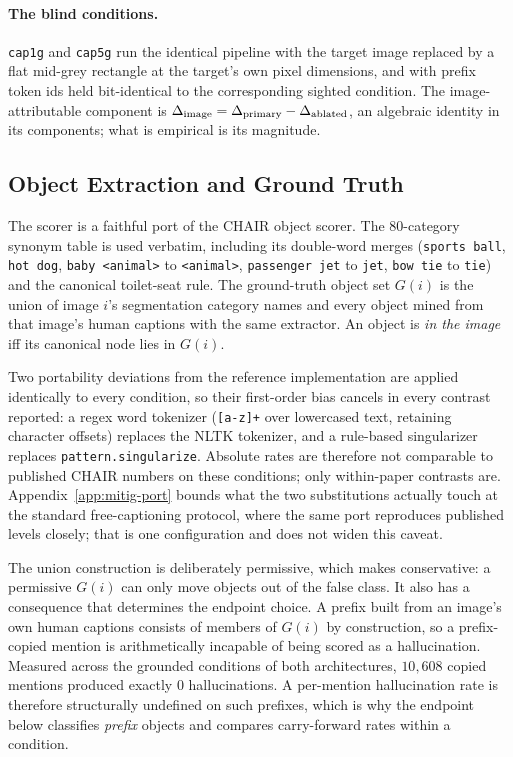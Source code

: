 \paragraph{The blind conditions.} \texttt{cap1g} and \texttt{cap5g} run the identical pipeline with
the target image replaced by a flat mid-grey rectangle at the target's own pixel dimensions, and with
prefix token ids held bit-identical to the corresponding sighted condition. The image-attributable
component is $\Delta_{\mathrm{image}} = \Delta_{\mathrm{primary}} - \Delta_{\mathrm{ablated}}$, an algebraic identity in its components; what is empirical
is its magnitude.

\subsection{Object Extraction and Ground Truth}
\label{app:gt}

The scorer is a faithful port of the CHAIR object scorer. The 80-category synonym table is used
verbatim, including its double-word merges (\texttt{sports ball}, \texttt{hot dog},
\texttt{baby <animal>} to \texttt{<animal>}, \texttt{passenger jet} to \texttt{jet}, \texttt{bow tie}
to \texttt{tie}) and the canonical toilet-seat rule. The ground-truth object set $G(i)$ is the union
of image $i$'s segmentation category names and every object mined from that image's human captions
with the same extractor. An object is \emph{in the image} iff its canonical node lies in $G(i)$.

Two portability deviations from the reference implementation are applied identically to every
condition, so their first-order bias cancels in every contrast reported: a regex word tokenizer
(\texttt{[a-z]+} over lowercased text, retaining character offsets) replaces the NLTK tokenizer, and
a rule-based singularizer replaces \texttt{pattern.singularize}. Absolute rates are therefore not
comparable to published CHAIR numbers on these conditions; only within-paper contrasts are.
Appendix~\ref{app:mitig-port} bounds what the two substitutions actually touch at the standard
free-captioning protocol, where the same port reproduces published levels closely; that is one
configuration and does not widen this caveat.

The union construction is deliberately permissive, which makes \rateF{} conservative: a permissive
$G(i)$ can only move objects out of the false class. It also has a consequence that determines the
endpoint choice. A prefix built from an image's own human captions consists of members of $G(i)$ by
construction, so a prefix-copied mention is arithmetically incapable of being scored as a
hallucination. Measured across the grounded conditions of both architectures, $10{,}608$ copied
mentions produced exactly $0$ hallucinations. A per-mention hallucination rate is therefore
structurally undefined on such prefixes, which is why the endpoint below classifies \emph{prefix}
objects and compares carry-forward rates within a condition.

